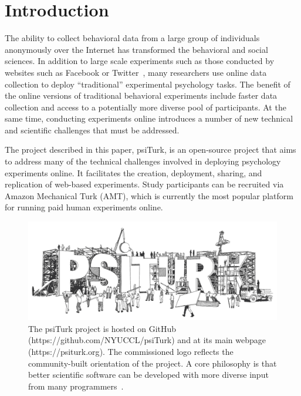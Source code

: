 \documentclass[twocolumn]{svjour3}          %
\newcommand{\psiturk}[0]{\textsf{psiTurk}}
\begin{document}

\section{Introduction}


The ability to collect behavioral data from a large group of individuals
anonymously over the Internet has transformed the behavioral and social
sciences.  In addition to large scale experiments such as those
conducted by websites such as Facebook or 
Twitter~\citep[e.g.,][]{Chen:2013pb,Kramer:2014dq,Wu:2011sp}, many researchers
use online data collection to deploy ``traditional'' experimental psychology
tasks.  The benefit of the online versions of traditional behavioral experiments include 
faster data collection and access to a potentially more diverse pool of participants. 
At the same time, conducting experiments online introduces a number of new 
technical and scientific challenges that must be addressed.

The project described in this paper, \psiturk{}, is an open-source project that aims to address many of the technical challenges
involved in deploying psychology experiments online.
It facilitates the creation, deployment, sharing, and replication of web-based experiments.
Study participants can be recruited via Amazon 
Mechanical Turk (AMT), which is currently the most popular platform for running 
paid human experiments online.

\begin{figure}[tp]
\centering
\includegraphics[scale=.30]{figures/psiturk_logo.jpg}
\caption{The \psiturk{} project is hosted on GitHub 
(\textsf{https://github.com/NYUCCL/psiTurk}) and at its main webpage (\textsf{https://psiturk.org}). 
The commissioned logo reflects the community-built orientation of the project.  A 
core philosophy is that better scientific software can be developed 
with more diverse input from many programmers~\citep{Raymond:1999zt}.}
\label{fig:logo}
\end{figure}
\end{document}
